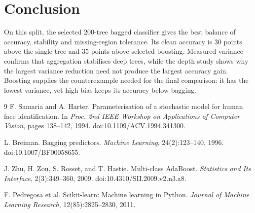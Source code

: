 \documentclass[10pt,twocolumn,letterpaper]{article}
\begin{document}
\section{Conclusion}
On this split, the selected 200-tree bagged classifier gives the best balance of accuracy, stability and missing-region tolerance. Its clean accuracy is 30 points above the single tree and 35 points above selected boosting. Measured variance confirms that aggregation stabilises deep trees, while the depth study shows why the largest variance reduction need not produce the largest accuracy gain. Boosting supplies the counterexample needed for the final comparison: it has the lowest variance, yet high bias keeps its accuracy below bagging.

\begin{thebibliography}{9}
\small
{}
F. Samaria and A. Harter. Parameterisation of a stochastic model for human face identification. In \emph{Proc. 2nd IEEE Workshop on Applications of Computer Vision}, pages 138--142, 1994. doi:10.1109/ACV.1994.341300.

L. Breiman. Bagging predictors. \emph{Machine Learning}, 24(2):123--140, 1996. doi:10.1007/BF00058655.

J. Zhu, H. Zou, S. Rosset, and T. Hastie. Multi-class AdaBoost. \emph{Statistics and Its Interface}, 2(3):349--360, 2009. doi:10.4310/SII.2009.v2.n3.a8.

F. Pedregosa et al. Scikit-learn: Machine learning in Python. \emph{Journal of Machine Learning Research}, 12(85):2825--2830, 2011.
\end{thebibliography}
\end{document}

